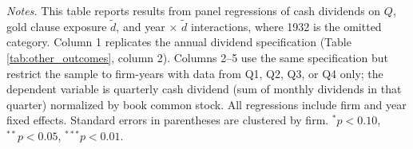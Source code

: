 \begin{table}[p]
\vspace*{3mm} \justifying \noindent
\scriptsize{\textit{Notes.} This table reports results from panel regressions of cash dividends on $Q$, gold clause exposure $\tilde{d}$, and year $\times$ $\tilde{d}$ interactions, where 1932 is the omitted category. Column 1 replicates the annual dividend specification (Table \ref{tab:other_outcomes}, column 2). Columns 2--5 use the same specification but restrict the sample to firm-years with data from Q1, Q2, Q3, or Q4 only; the dependent variable is quarterly cash dividend (sum of monthly dividends in that quarter) normalized by book common stock. All regressions include firm and year fixed effects. Standard errors in parentheses are clustered by firm. $^{*}p<0.10$, $^{**}p<0.05$, $^{***}p<0.01$.}
\end{table}